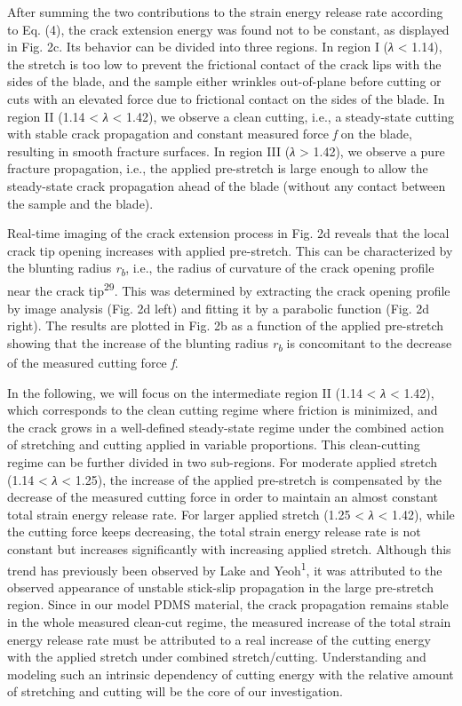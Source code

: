 \documentclass{article}
\begin{document}
After summing the two contributions to the strain energy release rate according to Eq. (4), the crack extension energy was found not to be constant, as displayed in Fig. 2c. Its behavior can be divided into three regions. In region I (\emph{λ} < 1.14), the stretch is too low to prevent the frictional contact of the crack lips with the sides of the blade, and the sample either wrinkles out-of-plane before cutting or cuts with an elevated force due to frictional contact on the sides of the blade. In region II (1.14 < \emph{λ} < 1.42), we observe a clean cutting, i.e., a steady-state cutting with stable crack propagation and constant measured force \emph{f} on the blade, resulting in smooth fracture surfaces. In region III (\emph{λ} > 1.42), we observe a pure fracture propagation, i.e., the applied pre-stretch is large enough to allow the steady-state crack propagation ahead of the blade (without any contact between the sample and the blade).

Real-time imaging of the crack extension process in Fig. 2d reveals that the local crack tip opening increases with applied pre-stretch. This can be characterized by the blunting radius \emph{r}\textsubscript{\emph{b}}, i.e., the radius of curvature of the crack opening profile near the crack tip\textsuperscript{29}. This was determined by extracting the crack opening profile by image analysis (Fig. 2d left) and fitting it by a parabolic function (Fig. 2d right). The results are plotted in Fig. 2b as a function of the applied pre-stretch showing that the increase of the blunting radius \emph{r}\textsubscript{\emph{b}} is concomitant to the decrease of the measured cutting force \emph{f}.

In the following, we will focus on the intermediate region II (1.14 < \emph{λ} < 1.42), which corresponds to the clean cutting regime where friction is minimized, and the crack grows in a well-defined steady-state regime under the combined action of stretching and cutting applied in variable proportions. This clean-cutting regime can be further divided in two sub-regions. For moderate applied stretch (1.14 < \emph{λ} < 1.25), the increase of the applied pre-stretch is compensated by the decrease of the measured cutting force in order to maintain an almost constant total strain energy release rate. For larger applied stretch (1.25 < \emph{λ} < 1.42), while the cutting force keeps decreasing, the total strain energy release rate is not constant but increases significantly with increasing applied stretch. Although this trend has previously been observed by Lake and Yeoh\textsuperscript{1}, it was attributed to the observed appearance of unstable stick-slip propagation in the large pre-stretch region. Since in our model PDMS material, the crack propagation remains stable in the whole measured clean-cut regime, the measured increase of the total strain energy release rate must be attributed to a real increase of the cutting energy with the applied stretch under combined stretch/cutting. Understanding and modeling such an intrinsic dependency of cutting energy with the relative amount of stretching and cutting will be the core of our investigation.
\end{document}

